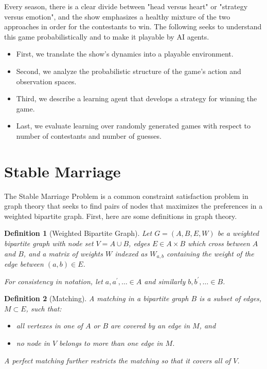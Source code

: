 \documentclass{article}
\newtheorem{definition}{Definition}[section]
\newcommand{\cross}{ \ensuremath{\times} }
\newcommand{\union}{ \ensuremath{\cup} }
\begin{document}
Every season, there is a clear divide between "head versus heart"
or "strategy versus emotion", and the show emphasizes a healthy
mixture of the two approaches in order for the contestants to win.
The following seeks to understand this game probabilistically and
to make it playable by AI agents.

\begin{itemize}
  \item First, we translate the show's dynamics into a
        playable environment.
  \item Second, we analyze the probabilistic structure of
        the game's action and observation spaces.
  \item Third, we describe a learning agent that develops
        a strategy for winning the game.
  \item Last, we evaluate learning over randomly
        generated games with respect to number of contestants
        and number of guesses.
\end{itemize}


\section{Stable Marriage}

The Stable Marriage Problem is a common constraint satisfaction problem
in graph theory that seeks to find pairs of nodes that maximizes the
preferences in a weighted bipartite graph. First, here are some
definitions in graph theory.

\begin{definition}[Weighted Bipartite Graph]
  Let $G = (A, B, E, W)$ be a weighted bipartite graph with node
  set $V = A \union B$, edges $E \in A \cross B$ which cross
  between $A$ and $B$, and a matrix of weights $W$ indexed as
  $W_{a,b}$ containing the weight of the edge between $(a, b) \in E$.

  For consistency in notation, let $a, a^{\prime}, \ldots \in A$
  and similarly $b, b^{\prime}, \ldots \in B$.
\end{definition}

\begin{definition}[Matching]
  A matching in a bipartite graph $B$ is a subset of edges,
  $M \subset E$, such that:

  \begin{itemize}
    \item all vertexes in one of $A$ or $B$ are covered by an edge in $M$, and
    \item no node in $V$ belongs to more than one edge in $M$.
  \end{itemize}

  A perfect matching further restricts the matching so that it
  covers all of $V$.
\end{definition}
\end{document}
